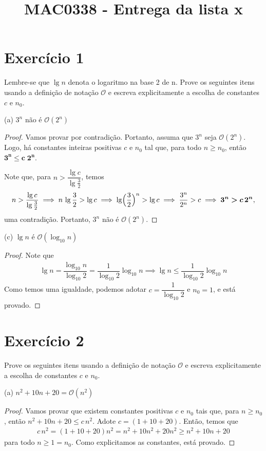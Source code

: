 \documentclass{article}
\author{}
\title{MAC0338 - Entrega da lista x}
\date{}
\newcommand{\bigO}[1]{\ensuremath{\mathcal{O}(#1)}}
\begin{document}
\maketitle

\section*{Exercício 1}
Lembre-se que $\lg n$ denota o logaritmo na base 2 de n. Prove os seguintes itens usando a definição de notação $\mathcal{O}$ e escreva explicitamente a escolha de constantes $c$ e $n_0$.

(a) $3^n$ não é \bigO{2^n}
\begin{proof}
Vamos provar por contradição. Portanto, assuma que $3^n$ seja \bigO{2^n}.
Logo, há constantes inteiras positivas $c$ e $n_0$ tal que, para todo $n \geq n_0$, então $\bm{3^n \leq c \; 2^n}$.

Note que, para $n > \dfrac{\lg c}{\lg \frac{3}{2}}$, temos
\begin{align*}
  n > \dfrac{\lg c}{\lg \frac{3}{2}} \implies n \, \lg \frac{3}{2} > \lg c \implies \lg \Bigl(\dfrac{3}{2}\Bigr)^n > \lg c \implies \dfrac{3^n}{2^n} > c \implies \bm{3^n > c \, 2^n} ,
\end{align*}
uma contradição. Portanto, $3^n$ não é \bigO{2^n}.

\end{proof}

(c) $\lg n$ é \bigO{\log_{10} n}
\begin{proof}
Note que
\begin{align*}
  \lg n = \dfrac{\log_{10} n}{\log_{10} 2} = \dfrac{1}{\log_{10} 2} \log_{10} n \implies \lg n \leq \dfrac{1}{\log_{10} 2} \log_{10} n
\end{align*}
Como temos uma igualdade, podemos adotar $c =\dfrac{1}{\log_{10} 2}$ e $n_0 = 1$, e está provado.

\end{proof}

\section*{Exercício 2}
Prove os seguintes itens usando a definição de notação $\mathcal{O}$ e escreva explicitamente a escolha de constantes $c$ e $n_0$.

(a) $n^2 + 10n + 20 = \bigO{n^2}$
\begin{proof}
Vamos provar que existem constantes positivas $c$ e $n_0$ tais que, para $n \geq n_0$, então $n^2 + 10n + 20 \leq c \, n^2$. Adote $c = (1 + 10 + 20)$. Então, temos que
\begin{align*}
  c \, n^2 = (1 + 10 + 20) n^2 = n^2 + 10n^2 + 20n^2 \geq n^2 + 10n + 20
\end{align*}
para todo $n \geq 1 = n_0$. Como explicitamos as constantes, está provado.

\end{proof}
\end{document}

